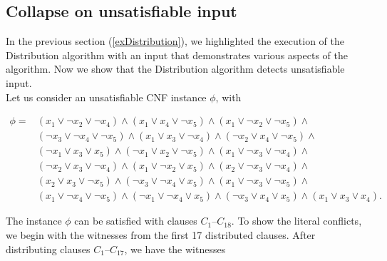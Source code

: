 \subsection{Collapse on unsatisfiable input}

In the previous section (\ref{exDistribution}), we highlighted the execution of the Distribution algorithm with an input that demonstrates various aspects of the algorithm.  Now we show that the Distribution algorithm detects unsatisfiable input. \\

Let us consider an unsatisfiable CNF instance $\phi$, with

\begin{align*}
\phi = &(x_{1} \vee  \neg x_{2} \vee  \neg x_{4} ) \wedge (x_{1} \vee x_{4} \vee  \neg x_{5} ) \wedge (x_{1} \vee  \neg x_{2} \vee  \neg x_{5} ) \wedge \\
&( \neg x_{3} \vee  \neg x_{4} \vee  \neg x_{5} ) \wedge (x_{1} \vee x_{3} \vee  \neg x_{4} ) \wedge ( \neg x_{2} \vee x_{4} \vee  \neg x_{5} ) \wedge \\
&( \neg x_{1} \vee x_{3} \vee x_{5} ) \wedge ( \neg x_{1} \vee x_{2} \vee  \neg x_{5} ) \wedge (x_{1} \vee  \neg x_{3} \vee  \neg x_{4} ) \wedge \\
&( \neg x_{2} \vee x_{3} \vee  \neg x_{4} ) \wedge (x_{1} \vee  \neg x_{2} \vee x_{5} ) \wedge (x_{2} \vee  \neg x_{3} \vee  \neg x_{4} ) \wedge \\
&(x_{2} \vee x_{3} \vee  \neg x_{5} ) \wedge ( \neg x_{3} \vee  \neg x_{4} \vee x_{5} ) \wedge (x_{1} \vee  \neg x_{3} \vee  \neg x_{5} ) \wedge \\
&(x_{1} \vee  \neg x_{4} \vee  \neg x_{5} ) \wedge ( \neg x_{1} \vee  \neg x_{4} \vee x_{5} ) \wedge ( \neg x_{3} \vee x_{4} \vee x_{5} ) \wedge (x_{1}	\vee x_{3} \vee x_{4}).
\end{align*}	

The instance $\phi$ can be satisfied with clauses $C_{1}$--$C_{18}$.  To show the literal conflicts, we begin with the witnesses from the first 17 distributed clauses.  After distributing clauses $C_1$--$C_{17}$, we have the witnesses

\begin{center}
\end{center}


